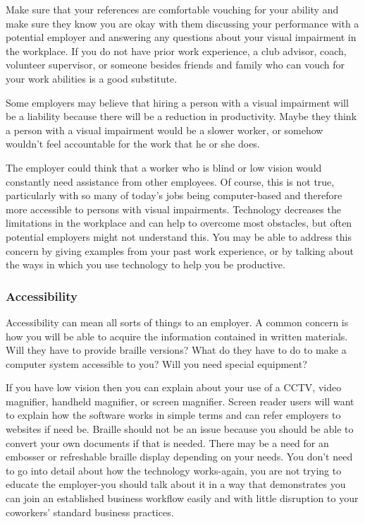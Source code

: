 Make sure that your references are comfortable vouching for your ability and make sure they know you are okay with them discussing your performance with a potential employer and answering any questions about your visual impairment in the workplace. If you do not have prior work experience, a club advisor, coach, volunteer supervisor, or someone besides friends and family who can vouch for your work abilities is a good substitute.

Some employers may believe that hiring a person with a visual impairment will be a liability because there will be a reduction in productivity. Maybe they think a person with a visual impairment would be a slower worker, or somehow wouldn't feel accountable for the work that he or she does.

The employer could think that a worker who is blind or low vision would constantly need assistance from other employees. Of course, this is not true, particularly with so many of today's jobs being computer-based and therefore more accessible to persons with visual impairments. Technology decreases the limitations in the workplace and can help to overcome most obstacles, but often potential employers might not understand this. You may be able to address this concern by giving examples from your past work experience, or by talking about the ways in which you use technology to help you be productive.

\subsubsection*{Accessibility}

Accessibility can mean all sorts of things to an employer. A common concern is how you will be able to acquire the information contained in written materials. Will they have to provide braille versions? What do they have to do to make a computer system accessible to you? Will you need special equipment?

If you have low vision then you can explain about your use of a CCTV, video magnifier, handheld magnifier, or screen magnifier. Screen reader users will want to explain how the software works in simple terms and can refer employers to websites if need be. Braille should not be an issue because you should be able to convert your own documents if that is needed. There may be a need for an embosser or refreshable braille display depending on your needs. You don't need to go into detail about how the technology works-again, you are not trying to educate the employer-you should talk about it in a way that demonstrates you can join an established business workflow easily and with little disruption to your coworkers' standard business practices.

